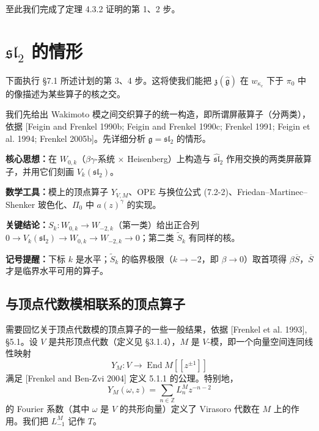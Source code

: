 至此我们完成了定理 4.3.2 证明的第 1、2 步。


\section{$\mathfrak{sl}_2$ 的情形}

下面执行 §7.1 所述计划的第 3、4 步。这将使我们能把 $\mathfrak{z}(\hat{\mathfrak{g}})$ 在 $w_{\kappa_c}$ 下于 $\pi_0$ 中的像描述为某些算子的核之交。

我们先给出 Wakimoto 模之间交织算子的统一构造，即所谓屏蔽算子（分两类），依据 [Feigin and Frenkel 1990b; Feigin and Frenkel 1990c; Frenkel 1991; Feigin et al. 1994; Frenkel 2005b]。先详细分析 $\mathfrak{g}=\mathfrak{sl}_2$ 的情形。

\begin{keypoints}
    \item \textbf{核心思想：}在 $W_{0,k}$（$\beta\gamma$-系统 $\times$ Heisenberg）上构造与 $\widehat{\mathfrak{sl}}_2$ 作用交换的两类屏蔽算子，并用它们刻画 $V_k(\mathfrak{sl}_2)$。
    \item \textbf{数学工具：}模上的顶点算子 $Y_{V,M}$、OPE 与换位公式 (7.2-2)、Friedan--Martinec--Shenker 玻色化、$\Pi_0$ 中 $a(z)^\gamma$ 的实现。
    \item \textbf{关键结论：}$S_k:W_{0,k}\to W_{-2,k}$（第一类）给出正合列 $0\to V_k(\mathfrak{sl}_2)\to W_{0,k}\to W_{-2,k}\to0$；第二类 $\widetilde{S}_k$ 有同样的核。
    \item \textbf{记号提醒：}下标 $k$ 是水平；$\widetilde{S}_k$ 的临界极限（$k\to-2$，即 $\beta\to0$）取首项得 $\beta\overline{S}$，$\overline{S}$ 才是临界水平可用的算子。
\end{keypoints}

\subsection{与顶点代数模相联系的顶点算子}

需要回忆关于顶点代数模的顶点算子的一些一般结果，依据 [Frenkel et al. 1993], §5.1。设 $V$ 是共形顶点代数（定义见 §3.1.4），$M$ 是 $V$-模，即一个向量空间连同线性映射
\[
    Y_M:V\longrightarrow\operatorname{End}M[[z^{\pm1}]]
\]
满足 [Frenkel and Ben-Zvi 2004] 定义 5.1.1 的公理。特别地，
\[
    Y_M(\omega,z)=\sum_{n\in\mathbb{Z}}L^M_nz^{-n-2}
\]
的 Fourier 系数（其中 $\omega$ 是 $V$ 的共形向量）定义了 Virasoro 代数在 $M$ 上的作用。我们把 $L^M_{-1}$ 记作 $T$。

